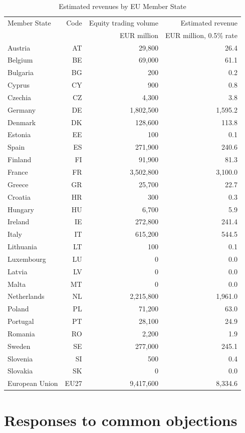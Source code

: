 \documentclass[../../main]{subfiles}
\begin{document}
\begin{longtable}{lrrr}
\caption{Estimated revenues by EU Member State}
\label{tab:revenues_member_states}\\
\hline
Member State & Code & Equity trading volume & Estimated revenue \\
             &      & EUR million & EUR million, 0.5\% rate \\
\hline
Austria & AT & 29,800 & 26.4 \\
Belgium & BE & 69,000 & 61.1 \\
Bulgaria & BG & 200 & 0.2 \\
Cyprus & CY & 900 & 0.8 \\
Czechia & CZ & 4,300 & 3.8 \\
Germany & DE & 1,802,500 & 1,595.2 \\
Denmark & DK & 128,600 & 113.8 \\
Estonia & EE & 100 & 0.1 \\
Spain & ES & 271,900 & 240.6 \\
Finland & FI & 91,900 & 81.3 \\
France & FR & 3,502,800 & 3,100.0 \\
Greece & GR & 25,700 & 22.7 \\
Croatia & HR & 300 & 0.3 \\
Hungary & HU & 6,700 & 5.9 \\
Ireland & IE & 272,800 & 241.4 \\
Italy & IT & 615,200 & 544.5 \\
Lithuania & LT & 100 & 0.1 \\
Luxembourg & LU & 0 & 0.0 \\
Latvia & LV & 0 & 0.0 \\
Malta & MT & 0 & 0.0 \\
Netherlands & NL & 2,215,800 & 1,961.0 \\
Poland & PL & 71,200 & 63.0 \\
Portugal & PT & 28,100 & 24.9 \\
Romania & RO & 2,200 & 1.9 \\
Sweden & SE & 277,000 & 245.1 \\
Slovenia & SI & 500 & 0.4 \\
Slovakia & SK & 0 & 0.0 \\
\hline
European Union & EU27 & 9,417,600 & 8,334.6 \\
\hline
\end{longtable}

\newpage

\section{Responses to common objections}
\end{document}
